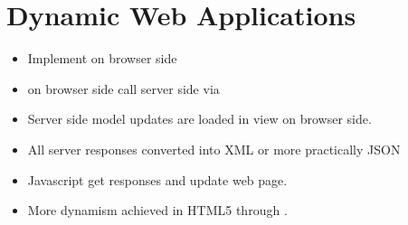 \documentclass[trans,compress,xcolor=table]{beamer}
\begin{document}
\section{Dynamic Web Applications}
\begin{frame}[fragile]
\begin{itemize}
\item Implement  on browser side
\item {} on browser side call server side 
	 via 
\item Server side model updates are loaded in view on browser side.
\item All server responses converted into XML or more practically JSON
\item Javascript get responses and update web page.
\item More dynamism achieved in HTML5 through .
\end{itemize}
\end{frame}
\end{document}
